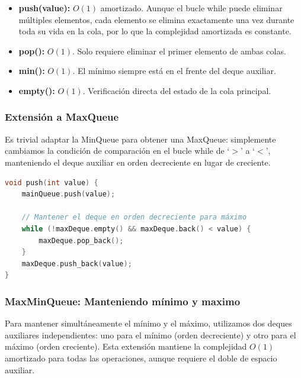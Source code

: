 \documentclass[12pt,a4paper]{article}
\begin{document}
\begin{itemize}
    \item \textbf{push(value):} $O(1)$ amortizado. Aunque el bucle while puede eliminar múltiples elementos, cada elemento se elimina exactamente una vez durante toda su vida en la cola, por lo que la complejidad amortizada es constante.
    
    \item \textbf{pop():} $O(1)$. Solo requiere eliminar el primer elemento de ambas colas.
    
    \item \textbf{min():} $O(1)$. El mínimo siempre está en el frente del deque auxiliar.
    
    \item \textbf{empty():} $O(1)$. Verificación directa del estado de la cola principal.
\end{itemize}

\subsubsection{Extensión a MaxQueue}

Es trivial adaptar la MinQueue para obtener una MaxQueue: simplemente cambiamos la condición de comparación en el bucle while de `$>$' a `$<$', manteniendo el deque auxiliar en orden decreciente en lugar de creciente.

\begin{lstlisting}[language=C++, label=lst:maxqueue_simple, caption={MaxMinQueue.hpp - Adaptación de MinQueue para MaxQueue}]
void push(int value) {
    mainQueue.push(value);
    
    // Mantener el deque en orden decreciente para máximo
    while (!maxDeque.empty() && maxDeque.back() < value) {
        maxDeque.pop_back();
    }
    maxDeque.push_back(value);
}
\end{lstlisting}

\subsubsection{MaxMinQueue: Manteniendo mínimo y maximo}

Para mantener simultáneamente el mínimo y el máximo, utilizamos dos deques auxiliares independientes: uno para el mínimo (orden decreciente) y otro para el máximo (orden creciente). Esta extensión mantiene la complejidad $O(1)$ amortizado para todas las operaciones, aunque requiere el doble de espacio auxiliar.
\end{document}
